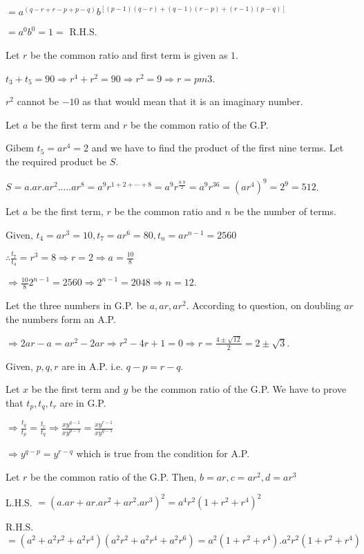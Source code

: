   $= a^{(q - r + r - p + p - q)}b^{[(p - 1)(q - r) + (q - 1)(r - p) + (r - 1)(p - q)]}$

  $= a^0b^0 = 1 =$ R.H.S.
\item Let $r$ be the common ratio and first term is given as $1$.

  $t_3 + t_5 = 90 \Rightarrow r^4 + r^2 = 90 \Rightarrow r^2 = 9 \Rightarrow r = pm 3$.

  $r^2$ cannot be $-10$ as that would mean that it is an imaginary number.
\item Let $a$ be the first term and $r$ be the common ratio of the G.P.

  Gibem $t_5 = ar^4 = 2$ and we have to find the product of the first nine terms. Let the required product be $S$.

  $S = a.ar.ar^2.\ldots.ar^8 = a^9r^{1 + 2 + \cdots + 8} = a^9r^{\tfrac{8.9}{2}} = a^9r^{36} = (ar^4)^9 = 2^9 = 512$.
\item Let $a$ be the first term, $r$ be the common ratio and $n$ be the number of terms.

  Given, $t_4 = ar^3 = 10, t_7 = ar^6 = 80, t_n = ar^{n - 1} = 2560$

  $\therefore \frac{t_7}{t_4} = r^3 = 8 \Rightarrow r = 2 \Rightarrow a = \frac{10}{8}$

  $\Rightarrow \frac{10}{8}2^{n- 1} = 2560 \Rightarrow 2^{n - 1} = 2048 \Rightarrow n = 12$.
\item Let the three numbers in G.P. be $a, ar, ar^2$. According to question, on doubling $ar$ the numbers form an A.P.

  $\Rightarrow 2ar - a = ar^2 - 2ar \Rightarrow r^2 - 4r + 1 = 0 \Rightarrow r = \frac{4\pm\sqrt{12}}{2} = 2\pm\sqrt{3}$.
\item Given, $p, q, r$ are in A.P. i.e. $q - p = r - q$.

  Let $x$ be the first term and $y$ be the common ratio of the G.P. We have to prove that $t_p, t_q, t_r$ are in G.P.

  $\Rightarrow \frac{t_q}{t_p} = \frac{t_r}{t_q} \Rightarrow \frac{xy^{q - 1}}{xy ^{p - 1}} = \frac{xy^{r - 1}}{xy^{q - 1}}$

  $\Rightarrow y^{q - p} = y^{r - q}$ which is true from the condition for A.P.
\item Let $r$ be the common ratio of the G.P. Then, $b = ar, c = ar^2, d = ar^3$

  L.H.S. $= (a.ar + ar.ar^2 + ar^2.ar^3)^2 = a^4r^2(1 + r^2 + r^4)^2$

  R.H.S. $= (a^2 + a^2r^2 + a^2r^4)(a^2r^2 + a^2r^4 + a^2r^6) = a^2(1 + r^2 + r^4).a^2r^2(1 + r^2 + r^4)$

